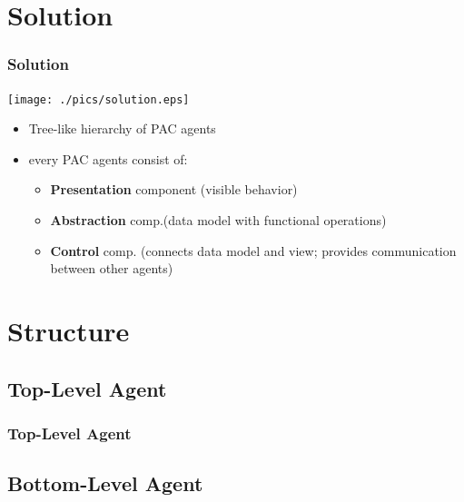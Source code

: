 \documentclass{beamer}
\begin{document}
\section{Solution}

\begin{frame}
\frametitle{Solution}

\begin{center}
 \texttt{[image: ./pics/solution.eps]}
\end{center}


 \begin{itemize}
  \item Tree-like hierarchy of PAC agents
  \item every PAC agents consist of:
  \begin{itemize}
   \item \textbf{Presentation} component (visible behavior)
   \item \textbf{Abstraction} comp.(data model with functional operations)
   \item \textbf{Control} comp. (connects data model and view; provides communication
between other agents)
  \end{itemize}
 \end{itemize}

 
\end{frame}


\section{Structure}

 


\subsection{Top-Level Agent}

\begin{frame}
 \frametitle{Top-Level Agent}
 
\end{frame}

\subsection{Bottom-Level Agent}
\end{document}
